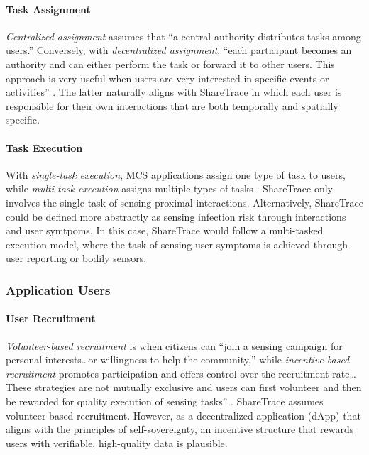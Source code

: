 \paragraph{Task Assignment}

\emph{Centralized assignment} assumes that ``a central authority distributes tasks among users.'' Conversely, with \emph{decentralized assignment}, ``each participant becomes an authority and can either perform the task or forward it to other users. This approach is very useful when users are very interested in specific events or activities'' \cite{Capponi2019}. The latter naturally aligns with ShareTrace in which each user is responsible for their own interactions that are both temporally and spatially specific.

\paragraph{Task Execution}

With \emph{single-task execution}, MCS applications assign one type of task to users, while \emph{multi-task execution} assigns  multiple types of tasks \cite{Capponi2019}. ShareTrace only involves the single task of sensing proximal interactions. Alternatively, ShareTrace could be defined more abstractly as sensing infection risk through interactions and user symtpoms. In this case, ShareTrace would follow a multi-tasked execution model, where the task of sensing user symptoms is achieved through user reporting or bodily sensors.

\subsubsection{Application Users}

\paragraph{User Recruitment}

\emph{Volunteer-based recruitment} is when citizens can ``join a sensing campaign for personal interests{\ldots}or willingness to help the community,'' while \emph{incentive-based recruitment} promotes participation and offers control over the recruitment rate{\ldots}These strategies are not mutually exclusive and users can first volunteer and then be rewarded for quality execution of sensing tasks'' \cite{Capponi2019}. ShareTrace assumes volunteer-based recruitment. However, as a decentralized application (dApp) that aligns with the principles of self-sovereignty, an incentive structure that rewards users with verifiable, high-quality data is plausible.

